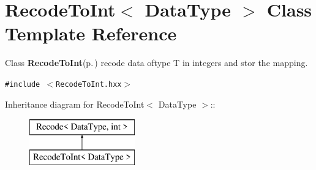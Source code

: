 \section{Recode\-To\-Int$<$ Data\-Type $>$ Class Template Reference}
\label{class_recode_to_int}
Class {\bf Recode\-To\-Int}{\rm (p.\,\pageref{class_recode_to_int})} recode data oftype T in integers and stor the mapping.  


{\tt \#include $<$Recode\-To\-Int.hxx$>$}

Inheritance diagram for Recode\-To\-Int$<$ Data\-Type $>$::\begin{figure}[H]
\begin{center}
\leavevmode
\includegraphics[height=2cm]{class_recode_to_int}
\end{center}
\end{figure}
